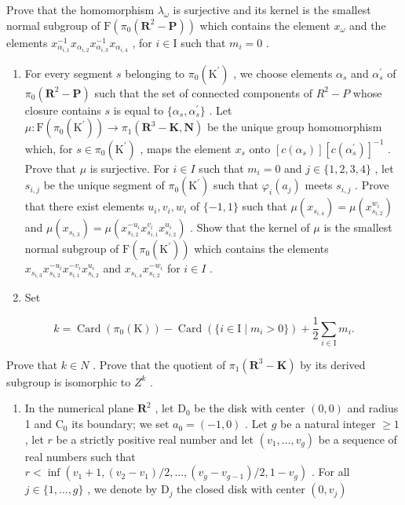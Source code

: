 Prove that the homomorphism \(\lambda_{\omega}\) is surjective and its kernel is the smallest normal subgroup of \(\mathrm{F}(\pi_0(\mathbf{R}^2 - \mathbf{P}))\) which contains the element \(x_{\omega}\) and the elements \(x_{\alpha_{i,1}}^{-1}x_{\alpha_{i,2}}x_{\alpha_{i,3}}^{-1}x_{\alpha_{i,4}}\) , for \(i \in \mathrm{I}\) such that \(m_i = 0\) .

\begin{enumerate}
\def\labelenumi{\alph{enumi})}
\setcounter{enumi}{3}
\item
   For every segment \(s\) belonging to \(\pi_{0}(\mathrm{K}^{\prime})\) , we choose elements \(\alpha_{s}\) and \(\alpha_{s}^{\prime}\) of \(\pi_{0}(\mathbf{R}^{2}-\mathbf{P})\) such that the set of connected components of \(R^{2}-P\) whose closure contains \(s\) is equal to \(\{\alpha_{s},\alpha_{s}^{\prime}\}\) . Let \(\mu\colon\mathrm{F}(\pi_{0}(\mathrm{K}^{\prime}))\to\pi_{1}(\mathbf{R}^{3}-\mathbf{K},\mathbf{N})\) be the unique group homomorphism which, for \(s\in\pi_{0}(\mathrm{K}^{\prime})\) , maps the element \(x_{s}\) onto \([c(\alpha_{s})][c(\alpha_{s}^{\prime})]^{-1}\) . Prove that \(\mu\) is surjective. For \(i\in I\) such that \(m_{i}=0\) and \(j\in\{1,2,3,4\}\) , let \(s_{i,j}\) be the unique segment of \(\pi_{0}(\mathrm{K}^{\prime})\) such that \(\varphi_{i}(a_{j})\) meets \(s_{i,j}\) . Prove that there exist elements \(u_{i},v_{i},w_{i}\) of \(\{-1,1\}\) such that \(\mu(x_{s_{i,4}})=\mu(x_{s_{i,2}}^{w_{i}})\) and \(\mu(x_{s_{i,3}})=\mu(x_{s_{i,2}}^{-u_{i}}x_{s_{i,1}}^{v_{i}}x_{s_{i,2}}^{u_{i}})\) . Show that the kernel of \(\mu\) is the smallest normal subgroup of \(\mathrm{F}(\pi_{0}(\mathrm{K}^{\prime}))\) which contains the elements \(x_{s_{i,3}}x_{s_{i,2}}^{-u_{i}}x_{s_{i,1}}^{-v_{i}}x_{s_{i,2}}^{u_{i}}\) and \(x_{s_{i,4}}x_{s_{i,2}}^{-w_{i}}\) for \(i\in I\) .
\item
  Set
\end{enumerate}

\[
k = \operatorname{Card} (\pi_ {0} (\mathrm{K})) - \operatorname{Card} (\{i \in \mathrm{I} \mid m _ {i} > 0 \}) + \frac {1}{2} \sum_ {i \in \mathrm{I}} m _ {i}.
\]

   Prove that \(k \in N\) . Prove that the quotient of \(\pi_{1}(\mathbf{R}^{3} - \mathbf{K})\) by its derived subgroup is isomorphic to \(Z^{k}\) .

\begin{enumerate}
\def\labelenumi{\arabic{enumi})}
\setcounter{enumi}{25}
\tightlist
\item
  In the numerical plane \(\mathbf{R}^2\) , let \(\mathrm{D}_0\) be the disk with center \((0,0)\) and radius 1 and \(\mathrm{C}_0\) its boundary; we set \(a_0 = (-1,0)\) . Let \(g\) be a natural integer \(\geqslant 1\) , let \(r\) be a strictly positive real number and let \((v_1,\ldots,v_g)\) be a sequence of real numbers such that \(r < \inf (v_{1} + 1,(v_{2} - v_{1}) / 2,\dots,(v_{g} - v_{g - 1}) / 2,1 - v_{g})\) . For all \(j\in \{1,\ldots,g\}\) , we denote by \(\mathrm{D}_j\) the closed disk with center \((0,v_j)\)
\end{enumerate}

